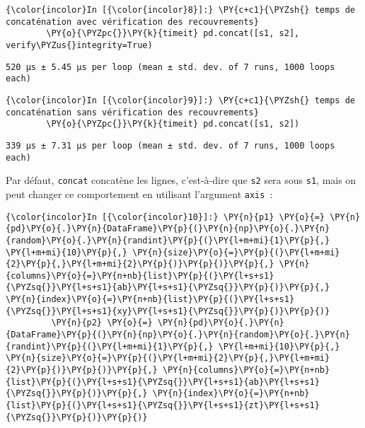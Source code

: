     \begin{Verbatim}[commandchars=\\\{\}]
{\color{incolor}In [{\color{incolor}8}]:} \PY{c+c1}{\PYZsh{} temps de concaténation avec vérification des recouvrements}
        \PY{o}{\PYZpc{}}\PY{k}{timeit} pd.concat([s1, s2], verify\PYZus{}integrity=True)
\end{Verbatim}


    \begin{Verbatim}[commandchars=\\\{\}]
520 µs ± 5.45 µs per loop (mean ± std. dev. of 7 runs, 1000 loops each)

    \end{Verbatim}

    \begin{Verbatim}[commandchars=\\\{\}]
{\color{incolor}In [{\color{incolor}9}]:} \PY{c+c1}{\PYZsh{} temps de concaténation sans vérification des recouvrements}
        \PY{o}{\PYZpc{}}\PY{k}{timeit} pd.concat([s1, s2])
\end{Verbatim}


    \begin{Verbatim}[commandchars=\\\{\}]
339 µs ± 7.31 µs per loop (mean ± std. dev. of 7 runs, 1000 loops each)

    \end{Verbatim}

    Par défaut, \texttt{concat} concatène les lignes, c'est-à-dire que
\texttt{s2} sera sous \texttt{s1}, mais on peut changer ce comportement
en utilisant l'argument \texttt{axis}~:

    \begin{Verbatim}[commandchars=\\\{\}]
{\color{incolor}In [{\color{incolor}10}]:} \PY{n}{p1} \PY{o}{=} \PY{n}{pd}\PY{o}{.}\PY{n}{DataFrame}\PY{p}{(}\PY{n}{np}\PY{o}{.}\PY{n}{random}\PY{o}{.}\PY{n}{randint}\PY{p}{(}\PY{l+m+mi}{1}\PY{p}{,} \PY{l+m+mi}{10}\PY{p}{,} \PY{n}{size}\PY{o}{=}\PY{p}{(}\PY{l+m+mi}{2}\PY{p}{,}\PY{l+m+mi}{2}\PY{p}{)}\PY{p}{)}\PY{p}{,} \PY{n}{columns}\PY{o}{=}\PY{n+nb}{list}\PY{p}{(}\PY{l+s+s1}{\PYZsq{}}\PY{l+s+s1}{ab}\PY{l+s+s1}{\PYZsq{}}\PY{p}{)}\PY{p}{,} \PY{n}{index}\PY{o}{=}\PY{n+nb}{list}\PY{p}{(}\PY{l+s+s1}{\PYZsq{}}\PY{l+s+s1}{xy}\PY{l+s+s1}{\PYZsq{}}\PY{p}{)}\PY{p}{)}
         \PY{n}{p2} \PY{o}{=} \PY{n}{pd}\PY{o}{.}\PY{n}{DataFrame}\PY{p}{(}\PY{n}{np}\PY{o}{.}\PY{n}{random}\PY{o}{.}\PY{n}{randint}\PY{p}{(}\PY{l+m+mi}{1}\PY{p}{,} \PY{l+m+mi}{10}\PY{p}{,} \PY{n}{size}\PY{o}{=}\PY{p}{(}\PY{l+m+mi}{2}\PY{p}{,}\PY{l+m+mi}{2}\PY{p}{)}\PY{p}{)}\PY{p}{,} \PY{n}{columns}\PY{o}{=}\PY{n+nb}{list}\PY{p}{(}\PY{l+s+s1}{\PYZsq{}}\PY{l+s+s1}{ab}\PY{l+s+s1}{\PYZsq{}}\PY{p}{)}\PY{p}{,} \PY{n}{index}\PY{o}{=}\PY{n+nb}{list}\PY{p}{(}\PY{l+s+s1}{\PYZsq{}}\PY{l+s+s1}{zt}\PY{l+s+s1}{\PYZsq{}}\PY{p}{)}\PY{p}{)}
\end{Verbatim}


